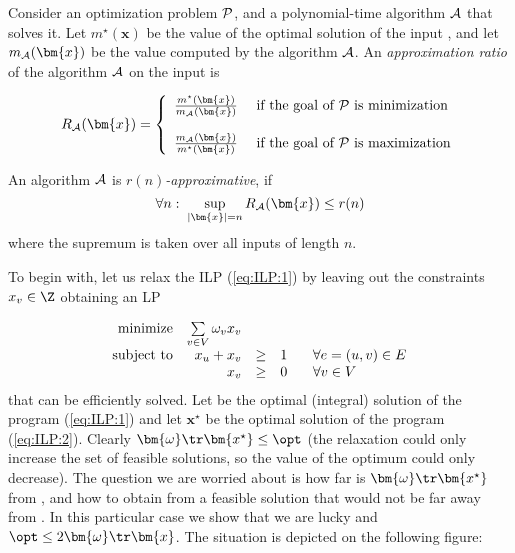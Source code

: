 \begin{framed}
  \begin{dfn}
    Consider an optimization problem  ${\cal P}$, and a polynomial-time algorithm ${\cal A}$
    that solves it. Let  $m^\star(\bm{x})$ be the value of the optimal solution of the input , and
    let $m_{\cal A}(\bm{x})$ be the value computed by the algorithm  ${\cal A}$.
    An {\em approximation ratio } of the algorithm  ${\cal A}$ on the input  is

    $$R_{\cal A}(\bm{x})=\left\{\begin{array}{ll}
        \frac{m^\star(\bm{x})}{m_{\cal A}(\bm{x})}&\text{\ if the goal of  $\cal P$ is minimization}\\[3ex]
      \frac{m_{\cal A}(\bm{x})}{m^\star(\bm{x})}&\text{\ if the goal of  $\cal P$ is maximization}\end{array}\right.$$
    
  \noindent  
   An algorithm $\cal A$ is {\em $r(n)$-approximative}, if
  $$\forall n:\;\sup_{|\bm{x}|=n}R_{\cal A}(\bm{x})\le r(n)$$
 where the supremum is taken over all inputs of length $n$.
  \end{dfn}
\end{framed}

To begin with, let us  relax the ILP (\ref{eq:ILP:1}) by leaving out the constraints  $x_v\in\Z$
obtaining an LP

\begin{equation}
\label{eq:ILP:2}
\begin{array}{rrcll}
  {\rm minimize}     & \multicolumn{1}{l}{\sum\limits_{v\in V}\omega_vx_v}\\
  {\rm subject\ to} & x_u + x_v&\ge&1& \;\;\;\forall e=(u,v)\in E\\
                          & x_v&\ge&0& \;\;\;\forall v\in V\\
\end{array}
\end{equation}
that can be efficiently solved. Let \opt be the optimal (integral) solution of the program (\ref{eq:ILP:1})
and let $\bm{x}^\star$ be the optimal solution of the program (\ref{eq:ILP:2}).  
Clearly  $\bm{\omega}\tr\bm{x^\star}\le\opt$ (the relaxation could only increase the set of feasible solutions,
so the value of the optimum could only decrease). The question we are worried about is how far is   
$\bm{\omega}\tr\bm{x^\star}$ from \opt, and how to obtain from  a feasible solution that would not be far away
from \opt. In this particular case we show that we are lucky and 
 $\opt\le2\bm{\omega}\tr\bm{x}$. The situation is depicted on the following figure:



